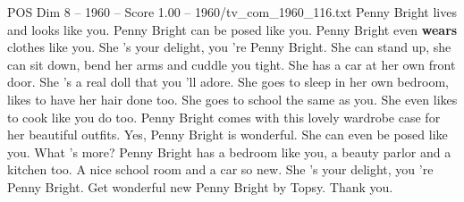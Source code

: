 \begin{textsample}{POS Dim 8 – 1960 – Score 1.00 – 1960/tv\_com\_1960\_116.txt}  \label{ex:f8_pos_070}
Penny Bright lives and looks like you.
Penny Bright can be posed like you.
Penny Bright even \textbf{wears} clothes like you.
She 's your delight, you 're Penny Bright.
She can stand up, she can sit down, bend her arms and cuddle you tight.
She has a car at her own front door.
She 's a real doll that you 'll adore.
She goes to sleep in her own bedroom, likes to have her hair done too.
She goes to school the same as you.
She even likes to cook like you do too.
Penny Bright comes with this lovely wardrobe case for her beautiful outfits.
Yes, Penny Bright is wonderful.
She can even be posed like you.
What 's more?
Penny Bright has a bedroom like you, a beauty parlor and a kitchen too.
A nice school room and a car so new.
She 's your delight, you 're Penny Bright.
Get wonderful new Penny Bright by Topsy.
Thank you.

\end{textsample}
